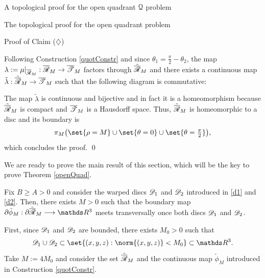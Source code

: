 \documentclass[11pt, a4paper, english, twoside, notitlepage, openright]{report}
\begin{document}
\begin{chapter}{A topological proof for the open quadrant $\mathcal{Q}$ problem}
\begin{section}{The topological proof for the open quadrant problem}
\begin{subsection}{Proof of Claim ($\diamondsuit$)}
\begin{lemma}
\begin{Proof}
Following Construction \ref{quotConstr} and since $\theta_1=\tfrac{\pi}{2}-\theta_2$, the map $\lambda:=\mu|_{\overline{\mathscr{R}}_M}:\overline{\mathscr{R}}_M\to\overline{\mathscr{T}}_M$ factors through $\tilde{\overline{\mathscr{R}}}_M$ and there exists a continuous map $\tilde{\lambda}:\tilde{\overline{\mathscr{R}}}_M\to\overline{\mathscr{T}}_M$ such that the following diagram is commutative:
\begin{center}
\end{center}
The map $\tilde{\lambda}$ is continuous and bijective and in fact it is a homeomorphism because $\tilde{\overline{\mathscr{R}}}_M$ is compact and $\overline{\mathscr{T}}_M$ is a Hausdorff space. Thus, $\tilde{\overline{\mathscr{R}}}_M$ is homeomorphic to a disc and its boundary is 
$$
\pi_M\big(\set{\rho=M}\cup\set{\theta=0}\cup\set{\theta=\tfrac{\pi}{2}}\big),
$$
which concludes the proof.
\qed
\end{Proof}
\end{lemma}

\vspace{1mm}

We are ready to prove  the main result of this section, which will be the key to prove Theorem \ref{openQuad}.

\vspace{1mm}

\begin{lemma}\label{mainlemmatop}
Fix $B\ge A>0$ and consider the warped discs $\mathscr{D}_1$ and $\mathscr{D}_2$ introduced in \eqref{d1} and \eqref{d2}. Then, there exists $M>0$ such that the boundary map $\partial\tilde{\phi}_M:\partial\tilde{\overline{\Rr}}_M\longrightarrow\R^3$ meets transversally once both discs $\mathscr{D}_1$ and $\mathscr{D}_2$.
\begin{Proof} First, since $\mathscr{D}_1$ and $\mathscr{D}_2$ are bounded, there exists $M_0>0$ such that 
$$
\D_1\cup\D_2\subset\set{(x,y,z):\norm{(x,y,z)}<M_0}\subset\R^3.
$$
Take $M:=4M_0$ and consider the set $\tilde{\overline{\mathscr{R}}}_M$ and the continuous map $\tilde{\phi}_M$ introduced in Construction \ref{quotConstr}.


\end{Proof}
\end{lemma}
\end{subsection}
\end{section}
\end{chapter}
\end{document}

